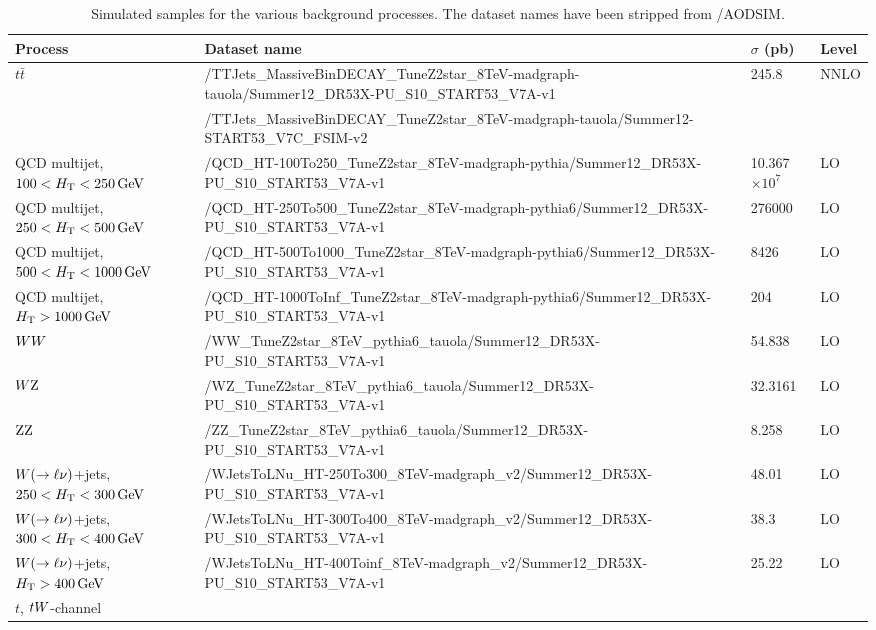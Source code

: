 \begin{table}
\fontsize{8 pt}{1 em}
\selectfont
\caption{Simulated samples for the various background processes. The dataset names have been stripped 
from /AODSIM.}
\begin{center}
\begin{tabular}{l l l l}
\toprule
Process & Dataset name & $\sigma$ (pb) & Level \\
\midrule
\multirow{2}{*}{$t\bar{t}$} &
/TTJets\_MassiveBinDECAY\_TuneZ2star\_8TeV-madgraph-tauola/Summer12\_DR53X-PU\_S10\_START53\_V7A-v1 
& 245.8 & NNLO \\
& /TTJets\_MassiveBinDECAY\_TuneZ2star\_8TeV-madgraph-tauola/Summer12-START53\_V7C\_FSIM-v2 & & \\
\midrule
QCD multijet, $100 < H_{\mathrm{T}}< 250\,\text{Ge\hspace{-.08em}V}$ & 
/QCD\_HT-100To250\_TuneZ2star\_8TeV-madgraph-pythia/Summer12\_DR53X-PU\_S10\_START53\_V7A-v1
& 10.367$\times 10^{7}$ & LO \\
QCD multijet, $250 < H_{\mathrm{T}}< 500\,\text{Ge\hspace{-.08em}V}$ &  
/QCD\_HT-250To500\_TuneZ2star\_8TeV-madgraph-pythia6/Summer12\_DR53X-PU\_S10\_START53\_V7A-v1
& 276000 & LO \\
QCD multijet, $500 < H_{\mathrm{T}}< 1000\,\text{Ge\hspace{-.08em}V}$ & 
/QCD\_HT-500To1000\_TuneZ2star\_8TeV-madgraph-pythia6/Summer12\_DR53X-PU\_S10\_START53\_V7A-v1 
& 8426 & LO \\
QCD multijet, $H_{\mathrm{T}} > 1000\,\text{Ge\hspace{-.08em}V}$ & 
/QCD\_HT-1000ToInf\_TuneZ2star\_8TeV-madgraph-pythia6/Summer12\_DR53X-PU\_S10\_START53\_V7A-v1 
& 204 & LO \\
\midrule
$WW$ & /WW\_TuneZ2star\_8TeV\_pythia6\_tauola/Summer12\_DR53X-PU\_S10\_START53\_V7A-v1 &
54.838 & LO \\
$W\mathrm{Z}$ & /WZ\_TuneZ2star\_8TeV\_pythia6\_tauola/Summer12\_DR53X-PU\_S10\_START53\_V7A-v1 
& 32.3161 & LO \\
$\mathrm{Z}\mathrm{Z}$ & /ZZ\_TuneZ2star\_8TeV\_pythia6\_tauola/Summer12\_DR53X-PU\_S10\_START53\_V7A-v1
& 8.258 & LO \\
\midrule
$W(\rightarrow\ell\nu)$+jets, $250 < H_{\mathrm{T}}< 300\,\text{Ge\hspace{-.08em}V}$ & 
/WJetsToLNu\_HT-250To300\_8TeV-madgraph\_v2/Summer12\_DR53X-PU\_S10\_START53\_V7A-v1 & 48.01
& LO \\
$W(\rightarrow\ell\nu)$+jets, $300 < H_{\mathrm{T}}< 400\,\text{Ge\hspace{-.08em}V}$ &
/WJetsToLNu\_HT-300To400\_8TeV-madgraph\_v2/Summer12\_DR53X-PU\_S10\_START53\_V7A-v1 & 38.3 &
LO \\
$W(\rightarrow\ell\nu)$+jets, $H_{\mathrm{T}} > 400\,\text{Ge\hspace{-.08em}V}$ &
/WJetsToLNu\_HT-400Toinf\_8TeV-madgraph\_v2/Summer12\_DR53X-PU\_S10\_START53\_V7A-v1 & 25.22
& LO \\
\midrule
$t$, $tW$-channel &

\end{tabular}
\end{center}
\end{table}
